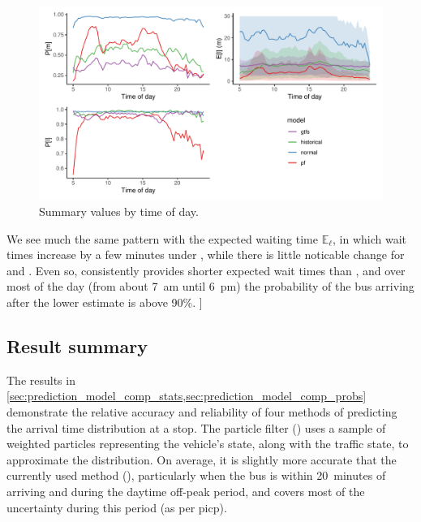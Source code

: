\begin{knitrout}\small
{}\color{fgcolor}\begin{figure}
\includegraphics[width=\textwidth]{figure/model_results_pr_timeofday-1} \caption[Summary values by time of day]{Summary values by time of day.}\label{fig:model_results_pr_timeofday}
\end{figure}


\end{knitrout}


We see much the same pattern with the expected waiting time $\mathbb{E}_\ell$, in which wait times increase by a few minutes under \Fpf{}, while there is little noticable change for \Fsched{} and \Fhist{}. Even so, \Fpf{} consistently provides shorter expected wait times than \Fsched{}, and over most of the day (from about 7~am until 6~pm) the probability of the bus arriving after the lower estimate is above 90\%.
]


\subsection{Result summary}
\label{sec:prediction_model_comp_summary}


The results in \cref{sec:prediction_model_comp_stats,sec:prediction_model_comp_probs} demonstrate the relative accuracy and reliability of four methods of predicting the arrival time distribution at a stop. The particle filter (\Fpf{}) uses a sample of weighted particles representing the vehicle's state, along with the \rt{} traffic state, to approximate the distribution. On average, it is slightly more accurate that the currently used method (\Fsched{}), particularly when the bus is within 20~minutes of arriving and during the daytime off-peak period, and covers most of the uncertainty during this period (as per \gls{picp}).

